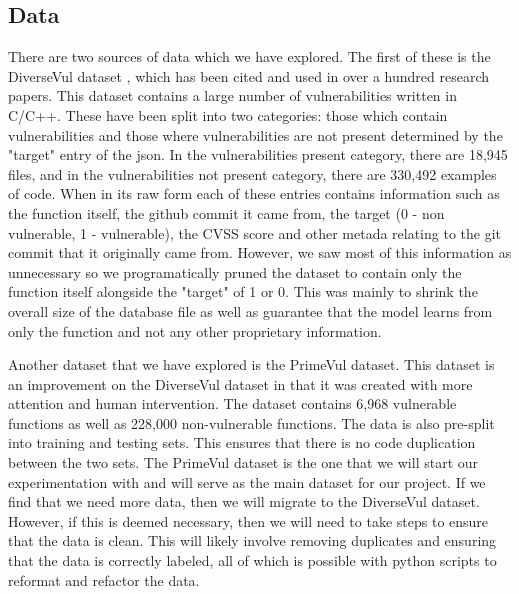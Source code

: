 \documentclass{article}
\begin{document}
\subsection{Data}
There are two sources of data which we have explored. The first of these is the 
DiverseVul dataset \cite{chen2023diversevulnewvulnerablesource}, which has been cited and used in over a hundred research papers. This dataset contains a large number of vulnerabilities written in C/C++.
These have been split into two categories: those which contain vulnerabilities and those
where vulnerabilities are not present determined by the "target" entry of the json. In the vulnerabilities present category, there are 
18,945 files, and in the vulnerabilities not present category, there are 330,492 
examples of code. When in its raw form each of these entries contains information such as the function itself, the github commit it came from,
the target (0 - non vulnerable, 1 - vulnerable), the CVSS score and other metada relating to the git commit that it originally came from. However, we saw 
most of this information as unnecessary so we programatically pruned the dataset to contain only the function itself alongside the "target" of 1 or 0. This
was mainly to shrink the overall size of the database file as well as guarantee that the model learns from only the function and not any other 
proprietary information. 

Another dataset that we have explored is the PrimeVul \cite{ding2024vulnerabilitydetectioncodelanguage} dataset. This dataset is an improvement on the DiverseVul dataset in that it was created with more attention and human
intervention. The dataset contains 6,968 vulnerable functions as well as 228,000 non-vulnerable functions. The data is also pre-split into training and testing sets. This ensures
that there is no code duplication between the two sets. The PrimeVul dataset is the one that
we will start our experimentation with and will serve as the main dataset for our project.
If we find that we need more data, then we will migrate to the DiverseVul dataset. However,
if this is deemed necessary, then we will need to take steps to ensure that the data is clean.
This will likely involve removing duplicates and ensuring that the data is correctly labeled,
all of which is possible with python scripts to reformat and refactor the data. 
\end{document}
